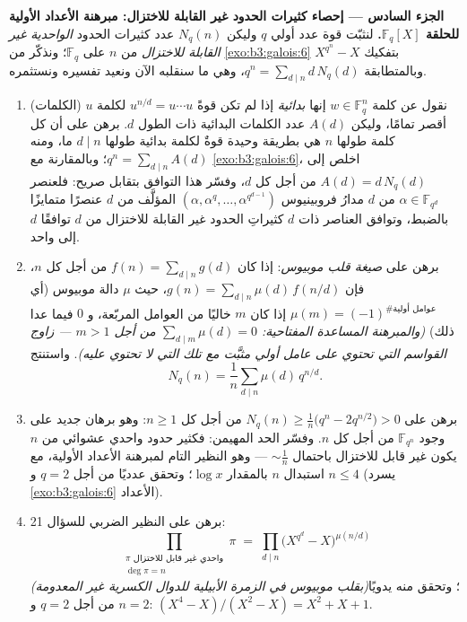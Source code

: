 \begin{problem}
\medskip
\noindent\textbf{الجزء السادس --- إحصاء كثيرات الحدود غير
القابلة للاختزال: مبرهنة الأعداد الأولية للحلقة
$\mathbb F_q[X]$.} لنثبّت قوة عدد أولي $q$ وليكن $N_q(n)$ عدد
كثيرات الحدود \emph{الواحدية غير القابلة للاختزال} من 
$n$ على $\mathbb F_q$؛ ونذكّر من \cref{exo:b3:galois:6} بتفكيك $X^{q^n} - X$
وبالمتطابقة $q^n = \sum_{d\mid n}d\,N_q(d)$، وهي ما سنقلبه الآن ونعيد تفسيره ونستثمره.
\begin{enumerate}[resume]
  \item (الكلمات) نقول عن كلمة $w \in \mathbb F_q^n$ إنها \emph{بدائية} إذا لم
        تكن قوةً $u^{n/d} =
        u\cdots u$ لكلمة $u$ أقصر تمامًا، وليكن $A(d)$ عدد
        الكلمات البدائية ذات الطول $d$. برهن على أن كل كلمة طولها
        $n$ هي بطريقة وحيدة قوةٌ لكلمة بدائية طولها $d \mid n$
        ما، ومنه $q^n = \sum_{d \mid n}A(d)$؛ وبالمقارنة مع \cref{exo:b3:galois:6}، اخلص إلى
        $A(d) = d\,N_q(d)$ من أجل كل $d$، وفسّر هذا التوافق بتقابل صريح:
        فلعنصر $\alpha \in
        \mathbb F_{q^d}$ من  $d$ مدارُ فروبينيوس $(\alpha, \alpha^q, \dots, \alpha^{q^{d-1}})$
        المؤلَّف من $d$ عنصرًا متمايزًا بالضبط، وتوافق العناصر
        ذات  $d$ كثيراتِ الحدود غير القابلة للاختزال من
         $d$ توافقًا $d$ إلى واحد.
  \item برهن على \emph{صيغة قلب موبيوس}: إذا كان $f(n) =
        \sum_{d\mid n}g(d)$ من أجل
        كل $n$، فإن $g(n) =
        \sum_{d\mid n}\mu(d)\,f(n/d)$، حيث $\mu$ دالة موبيوس (أي $\mu(m) = (-1)^{\#\text{عوامل أولية}}$
        إذا كان $m$ خاليًا من العوامل المربّعة، و $0$ فيما عدا
        ذلك) \emph{(والمبرهنة المساعدة المفتاحية: $\sum_{d \mid m}\mu(d) = 0$ من
        أجل $m >
        1$ --- زاوج القواسم التي تحتوي على عامل أولي
        مثبَّت مع تلك التي لا تحتوي عليه)}. واستنتج
        \[
        N_q(n) = \frac1n\sum_{d \mid n}\mu(d)\,q^{n/d} .
        \]
  \item برهن على $N_q(n) \geq \frac1n\bigl(q^n - 2q^{n/2}\bigr) > 0$ من أجل كل $n \geq 1$: وهو برهان جديد
        على وجود $\mathbb F_{q^n}$ من أجل كل $n$. وفسّر الحد المهيمن:
        فكثير حدود واحدي عشوائي من  $n$ يكون غير قابل
        للاختزال باحتمال $\sim \frac1n$ --- وهو النظير التام
        لمبرهنة الأعداد الأولية، مع استبدال $n$ بالمقدار $\log x$؛
        وتحقق عدديًا من أجل $q = 2$ و $n \leq 4$ (يسرد
        \cref{exo:b3:galois:6} الأعداد).
  \item برهن على النظير الضربي للسؤال 21:
        \[
        \prod_{\substack{\pi \text{ واحدي غير قابل للاختزال}\\ \deg\pi =
        n}}\pi \;=\; \prod_{d \mid n}
        \bigl(X^{q^d} - X\bigr)^{\mu(n/d)}
        \]
        \emph{(بقلب موبيوس في الزمرة الأبيلية للدوال الكسرية غير
        المعدومة)}؛ وتحقق منه يدويًا من أجل $q
        = 2$ و $n = 2$:
        $(X^4 - X)/(X^2 - X) = X^2 + X + 1$.
\end{enumerate}


\end{problem}
